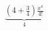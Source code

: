 \documentclass[preview]{standalone}
\begin{document}
\begin{align*}
\underbrace{(4+\frac{3}{4})\frac{x^4}{4!}}_{4}
\end{align*}
\end{document}
